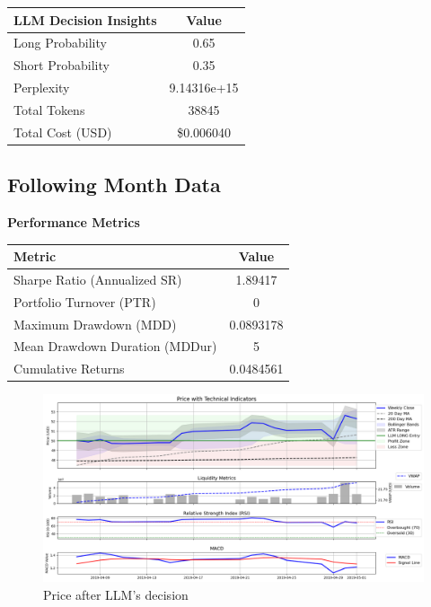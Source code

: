 \documentclass[8pt]{scrartcl}
\begin{document}
\begin{longtable}{l c}
\toprule
\textbf{LLM Decision Insights} & \textbf{Value} \\
\midrule
Long Probability & 0.65 \\
Short Probability & 0.35 \\
Perplexity & 9.14316e+15 \\
\midrule
Total Tokens & 38845 \\
Total Cost (USD) & \$0.006040 \\
\bottomrule
\end{longtable}

\subsection*{Following Month Data}

\textbf{Performance Metrics}

\begin{longtable}{l c}
\toprule
\textbf{Metric} & \textbf{Value} \\
\midrule
Sharpe Ratio (Annualized SR) & 1.89417 \\
Portfolio Turnover (PTR) & 0 \\
Maximum Drawdown (MDD) & 0.0893178 \\
Mean Drawdown Duration (MDDur) & 5 \\
Cumulative Returns & 0.0484561 \\
\bottomrule
\end{longtable}


\begin{figure}[H]
    \centering
    \includegraphics[width=1\linewidth]{judge_reviews//AAPL_M_gpt-4o-mini//2019-04-01/llm_Price_with_Technical_Indicators.png}
    \caption{Price after LLM's decision}
\end{figure}
\end{document}
